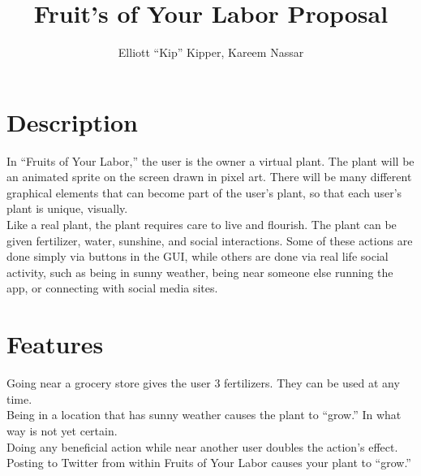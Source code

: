 \documentclass[12pt]{article}
\begin{document}
\title{Fruit's of Your Labor Proposal}

\author{Elliott ``Kip'' Kipper, Kareem Nassar}

\maketitle

\section{Description}
In ``Fruits of Your Labor,'' the user is the owner a virtual plant.  The plant will be an animated sprite on the screen drawn in pixel art.  There will be many different graphical elements that can become part of the user's plant, so that each user's plant is unique, visually.
\\Like a real plant, the plant requires care to live and flourish.  The plant can be given fertilizer, water, sunshine, and social interactions.  Some of these actions are done simply via buttons in the GUI, while others are done via real life social activity, such as being in sunny weather, being near someone else running the app, or connecting with social media sites.

\section{Features}
Going near a grocery store gives the user 3 fertilizers.  They can be used at any time.
\\Being in a location that has sunny weather causes the plant to ``grow.''  In what way is not yet certain.
\\Doing any beneficial action while near another user doubles the action's effect.
\\Posting to Twitter from within Fruits of Your Labor causes your plant to ``grow.''
\end{document}

